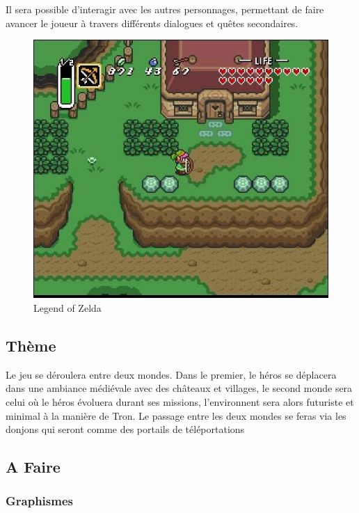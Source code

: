 \documentclass[12pt,a4paper]{article}
\begin{document}
Il sera possible d'interagir avec les autres personnages, permettant de faire avancer le joueur à travers différents dialogues et quêtes secondaires.

\begin{figure}[hp]
          \centering
          \includegraphics[scale=0.60]{image-zelda.jpg}
\caption{Legend of Zelda}
\label{fig:}
          
\end{figure}
\newpage

\subsection{Thème}
Le jeu se déroulera entre deux mondes. Dans le premier, le héros se déplacera dans une ambiance médiévale avec des châteaux et villages, le second monde sera celui où le héros évoluera durant ses missions, l'environnent sera alors futuriste et minimal à la manière de Tron. Le passage entre les deux mondes se feras via les donjons qui seront comme des portails de téléportations

      \subsection{A Faire }

\subsubsection{Graphismes}
\end{document}
